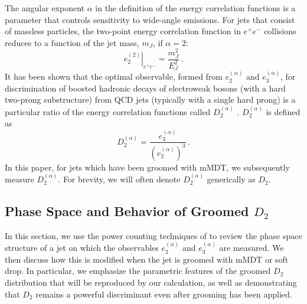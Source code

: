 \documentclass[a4paper,11pt]{article}
\newcommand{\ecf}[2]{e_{#1}^{(#2)}}
\begin{document}
The angular exponent $\alpha$ in the definition of the energy correlation functions is a parameter that controls sensitivity to wide-angle emissions.  For jets that consist of massless particles, the two-point energy correlation function in $e^+e^-$ collisions reduces to a function of the jet mass, $m_J$, if $\alpha=2$:
\begin{equation}
\left.\ecf{2}{2}\right|_{e^+e^-} = \frac{m_J^2}{E_J^2}\,.
\end{equation} 
It has been shown that the optimal observable, formed from $\ecf{2}{\alpha}$ and $\ecf{3}{\alpha}$, for discrimination of boosted hadronic decays of electroweak bosons (with a hard two-prong substructure) from QCD jets (typically with a single hard prong) is a particular ratio of the energy correlation functions called $D_2^{(\alpha)}$ \cite{Larkoski:2014gra,Larkoski:2015kga}.  $D_2^{(\alpha)}$ is defined as
\begin{equation}
D_2^{(\alpha)} = \frac{\ecf{3}{\alpha}}{(\ecf{2}{\alpha})^3}\,.
\end{equation}
In this paper, for jets which have been groomed with mMDT, we subsequently measure $D_2^{(\alpha)}$.  For brevity, we will often denote $D_2^{(\alpha)}$ generically as $D_2$.


\subsection{Phase Space and Behavior of Groomed $D_2$}\label{sec:ps_struc}

In this section, we use the power counting techniques of \cite{Larkoski:2014gra} to review the phase space structure of a jet on which the observables $\ecf{2}{\alpha}$ and $\ecf{3}{\alpha}$ are measured. We then discuss how this is modified when the jet is groomed with mMDT or soft drop. In particular, we emphasize the parametric features of the groomed $D_2$ distribution that will be reproduced by our calculation, as well as demonstrating that $D_2$ remains a powerful discriminant even after grooming has been applied.
\end{document}
